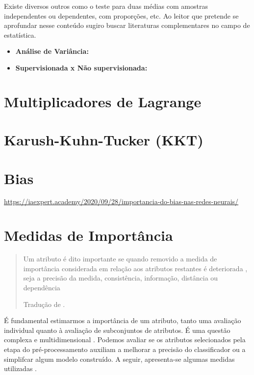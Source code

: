 \documentclass[
]{book}
\begin{document}
Existe diversos outros como o teste para duas médias com amostras independentes ou dependentes, com proporções, etc. Ao leitor que pretende se aprofundar nesse conteúdo sugiro buscar literaturas complementares no campo de estatística.

\begin{itemize}
\item
  \textbf{Análise de Variância:}
\item
  \textbf{Supervisionada x Não supervisionada:}
\end{itemize}

\hypertarget{multlagrange}{%
\section{Multiplicadores de Lagrange}\label{multlagrange}}

\hypertarget{kkt}{%
\section{Karush-Kuhn-Tucker (KKT)}\label{kkt}}

\hypertarget{bias}{%
\section{Bias}\label{bias}}

\url{https://iaexpert.academy/2020/09/28/importancia-do-bias-nas-redes-neurais/}

\hypertarget{medidasimport}{%
\section{Medidas de Importância}\label{medidasimport}}

\begin{quote}
Um atributo é dito importante se quando removido a medida de importância considerada em relação aos atributos restantes é deteriorada , seja a precisão da medida, consistência, informação, distância ou dependência

Tradução de \citet{liu2012feature}.
\end{quote}

É fundamental estimarmos a importância de um atributo, tanto uma avaliação individual quanto à avaliação de subconjuntos de atributos. É uma questão complexa e multidimensional \citep{liu2012feature}. Podemos avaliar se os atributos selecionados pela etapa do pré-processamento auxiliam a melhorar a precisão do classificador ou a simplifcar algum modelo construído. A seguir, apresenta-se algumas medidas utilizadas \citep{lee2005seleccao}.
\end{document}
